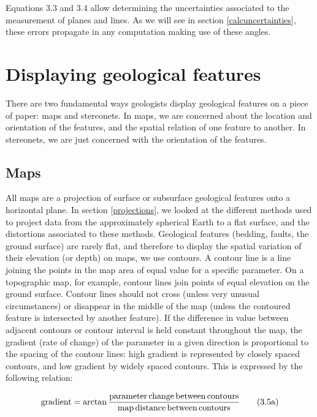 \documentclass[a4paper , 12pt]{book}
\begin{document}
Equations 3.3 and 3.4 allow determining the uncertainties associated to the measurement of planes and lines. As we will see in section \ref{calcuncertainties}, these errors propagate in any computation making use of these angles.

\section{Displaying geological features}

There are two fundamental ways geologists display geological features on a piece of paper: maps and stereonets. In maps, we are concerned about the location and orientation of the features, and the spatial relation of one feature to another. In stereonets, we are just concerned with the orientation of the features.

\subsection{Maps}

All maps are a projection of surface or subsurface geological features onto a horizontal plane. In section \ref{projections}, we looked at the different methods used to project data from the approximately spherical Earth to a flat surface, and the distortions associated to these methods. Geological features (bedding, faults, the ground surface) are rarely flat, and therefore to display the spatial variation of their elevation (or depth) on maps, we use contours. A contour line is a line joining the points in the map area of equal value for a specific parameter. On a topographic map, for example, contour lines join points of equal elevation on the ground surface. Contour lines should not cross (unless very unusual circumstances) or disappear in the middle of the map (unless the contoured feature is intersected by another feature). If the difference in value between adjacent contours or contour interval is held constant throughout the map, the gradient (rate of change) of the parameter in a given direction is proportional to the spacing of the contour lines: high gradient is represented by closely spaced contours, and low gradient by widely spaced contours. This is expressed by the following relation:

\begin{equation}
    \text{gradient} = \arctan\frac{\text{parameter\,change\,between\,contours}}{\text{map\,distance\,between\,contours}} \tag{3.5a}
\end{equation}
\end{document}
